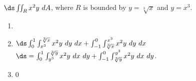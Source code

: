 {$\ds \iint_R x^2y\ dA$, where $R$ is bounded by $y=\sqrt[3]{x}$ and $y=x^3$.
}
{\begin{enumerate}
\item \noindent \begin{minipage}{.9\linewidth}
\end{minipage}
\item	$\ds \int_0^1\int_{x^3}^{\sqrt[3]{x}}x^2y\ dy\ dx + \int_{-1}^0\int_{\sqrt[3]{x}}^{x^3}x^2y\ dy\ dx$ $\ds = \int_0^1\int_{y^3}^{\sqrt[3]{y}}x^2y\ dx\ dy +\int_{-1}^0\int_{\sqrt[3]{y}}^{y^3}x^2y\ dx\ dy$.
\item 0
\end{enumerate}
}